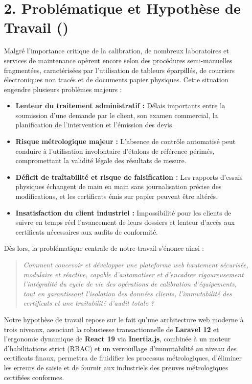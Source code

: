 \documentclass{bts-report}
\begin{document}
\section*{2. Probl\'ematique et Hypoth\`ese de Travail ()}
Malgr\'e l'importance critique de la calibration, de nombreux laboratoires et services de maintenance op\`erent encore selon des proc\'edures semi-manuelles fragment\'ees, caract\'eris\'ees par l'utilisation de tableurs \'eparpill\'es, de courriers \'electroniques non trac\'es et de documents papier physiques. Cette situation engendre plusieurs probl\`emes majeurs :
\begin{itemize}
  \item \textbf{Lenteur du traitement administratif :} D\'elais importants entre la soumission d'une demande par le client, son examen commercial, la planification de l'intervention et l'\'emission des devis.
  \item \textbf{Risque m\'etrologique majeur :} L'absence de contr\^ole automatis\'e peut conduire \`a l'utilisation involontaire d'\'etalons de r\'ef\'erence p\'erim\'es, compromettant la validit\'e l\'egale des r\'esultats de mesure.
  \item \textbf{D\'eficit de tra\^itabilit\'e et risque de falsification :} Les rapports d'essais physiques \'echangent de main en main sans journalisation pr\'ecise des modifications, et les certificats \'emis sur papier peuvent \^etre alt\'er\'es.
  \item \textbf{Insatisfaction du client industriel :} Impossibilit\'e pour les clients de suivre en temps r\'eel l'avancement de leurs dossiers et lenteur d'acc\`es aux certificats n\'ecessaires aux audits de conformit\'e.
\end{itemize}

D\`es lors, la probl\'ematique centrale de notre travail s'\'enonce ainsi :
\begin{quote}
\itshape
\og Comment concevoir et d\'evelopper une plateforme web hautement s\'ecuris\'ee, modulaire et r\'eactive, capable d'automatiser et d'encadrer rigoureusement l'int\'egralit\'e du cycle de vie des op\'erations de calibration d'\'equipements, tout en garantissant l'isolation des donn\'ees clients, l'immutabilit\'e des certificats et une tra\^itabilit\'e d'audit totale ? \fg
\end{quote}

Notre hypoth\`ese de travail repose sur le fait qu'une architecture web moderne \`a trois niveaux, associant la robustesse transactionnelle de \textbf{Laravel 12} et l'ergonomie dynamique de \textbf{React 19} via \textbf{Inertia.js}, combin\'ee \`a un moteur d'habilitations strict (RBAC) et un verrouillage d'immutabilit\'e au niveau des certificats finaux, permettra de fluidifier les processus m\'etrologiques, d'\'eliminer les erreurs de saisie et de fournir aux industriels des preuves m\'etrologiques certifi\'ees conformes.
\end{document}
